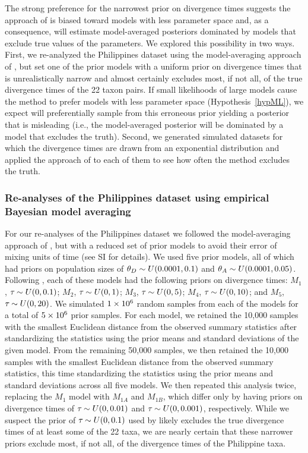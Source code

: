 The strong preference for the narrowest prior on divergence times suggests the
approach of \citet{Hickerson2013} is biased toward models with less parameter
space and, as a consequence, will estimate model-averaged posteriors dominated
by models that exclude true values of the parameters.
We explored this possibility in two ways.
First, we re-analyzed the Philippines dataset using the model-averaging
approach of \citet{Hickerson2013}, but set one of the prior models with a
uniform prior on divergence times that is unrealistically narrow and almost
certainly excludes most, if not all, of the true divergence times of the 22
taxon pairs.
If small likelihoods of large models cause the method to prefer models with
less parameter space (Hypothesis~\ref{hypML}), we expect \msb will
preferentially sample from this erroneous prior yielding a posterior that is
misleading (i.e., the model-averaged posterior will be dominated by a model
that excludes the truth).
Second, we generated simulated datasets for which the divergence times are
drawn from an exponential distribution and applied the approach of
\citet{Hickerson2013} to each of them to see how often the method excludes the
truth.

\subsubsection{Re-analyses of the Philippines dataset using empirical Bayesian
model averaging}

For our re-analyses of the Philippines dataset we followed the model-averaging
approach of \citet{Hickerson2013}, but with a reduced set of prior models to
avoid their error of mixing units of time (see SI for details).
We used five prior models, all of which had priors on population sizes of
$\meanDescendantTheta{} \sim U(0.0001, 0.1)$ and $\ancestralTheta{} \sim
U(0.0001, 0.05)$.
Following \citet{Hickerson2013}, each of these models had the following
priors on divergence times:
$M_1$, $\tau_{} \sim U(0, 0.1)$;
$M_2$, $\tau_{} \sim U(0, 1)$;
$M_3$, $\tau_{} \sim U(0, 5)$;
$M_4$, $\tau_{} \sim U(0, 10)$; and
$M_5$, $\tau_{} \sim U(0, 20)$.
We simulated $1\times 10^{6}$ random samples from each of the models for a total of
$5\times 10^{6}$ prior samples.
For each model, we retained the 10,000 samples with the smallest Euclidean
distance from the observed summary statistics after standardizing the
statistics using the prior means and standard deviations of the given model.
From the remaining 50,000 samples, we then retained the 10,000 samples with the
smallest Euclidean distance from the observed summary statistics, this time
standardizing the statistics using the prior means and standard deviations
across all five models.
We then repeated this analysis twice, replacing the $M_1$ model with
$M_{1A}$ and $M_{1B}$, which differ only by having priors on divergence
times of $\tau_{} \sim U(0, 0.01)$ and $\tau_{} \sim U(0, 0.001)$,
respectively.
While we suspect the prior of $\tau_{} \sim U(0, 0.1)$ used by
\citet{Hickerson2013} likely excludes the true divergence times of at least
some of the 22 taxa, we are nearly certain that these narrower priors exclude
most, if not all, of the divergence times of the Philippine taxa.

